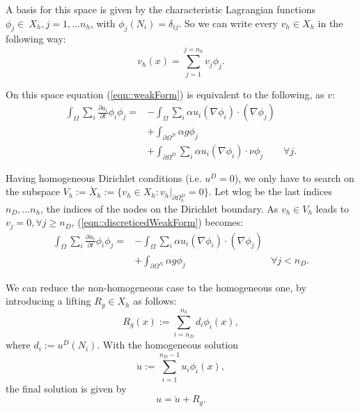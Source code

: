 A basis for this space is given by the characteristic Lagrangian functions $\phi_j\in\ X_h, j=1,\dots n_h$, with $\phi_j(N_i) = \delta_{ij}$. So we can write every $v_h\in X_h$ in the following way:
\begin{equation*}
	v_h(x) = \sum_{j=1}^{j=n_h}v_j\phi_j.
\end{equation*}

On this space equation (\ref{eqn::weakForm}) is equivalent to the following, as $v$:
\begin{equation}
\label{eqn::discreticedWeakForm}
\begin{aligned}
	\int_{\Omega} \sum_i \frac{\partial u_i}{\partial t} \phi_i \phi_j = &-\int_{\Omega} \sum_i \alpha u_i(\nabla \phi_i) \cdot (\nabla \phi_j) \\
	&+ \int_{\partial\Omega^N} \alpha g\phi_j \\
	&+ \int_{\partial\Omega^D} \sum_i \alpha u_i (\nabla \phi_i) \cdot \nu \phi_j & \forall j.
\end{aligned}
\end{equation}

Having homogeneous Dirichlet conditions (i.e. $u^D=0$), we only have to search on the subspace $V_h:=\mathring{X}_h:=\{v_h\in X_h : v_h|_{\partial\Omega_h^D} = 0\}$. Let wlog be the last indices $n_D,\dots n_h$, the indices of the nodes on the Dirichlet boundary. As $v_h\in V_h$ leads to $v_j = 0, \forall j\geq n_D$, (\ref{eqn::discreticedWeakForm}) becomes:
\begin{equation}
\label{eqn::homogeneousForm}
\begin{aligned}
	\int_{\Omega} \sum_i \frac{\partial u_i}{\partial t} \phi_i \phi_j = &-\int_{\Omega} \sum_i \alpha u_i(\nabla \phi_i) \cdot (\nabla \phi_j) \\
	&+ \int_{\partial\Omega^N} \alpha g\phi_j
	 & \forall j < n_D.
\end{aligned}
\end{equation}

We can reduce the non-homogeneous case to the homogeneous one, by introducing a lifting $R_g\in X_h$ as follows:
\begin{equation*}
	R_g(x) := \sum_{i=n_D}^{n_h}d_i \phi_i(x),
\end{equation*}
where $d_i:=u^D(N_i)$. With the homogeneous solution
\begin{equation*}
	\mathring{u} := \sum_{i=1}^{n_D-1}u_i \phi_i(x),
\end{equation*}
the final solution is given by
\begin{equation}
	\label{eqn::fullu}
	u = \mathring{u} + R_g.
\end{equation}


